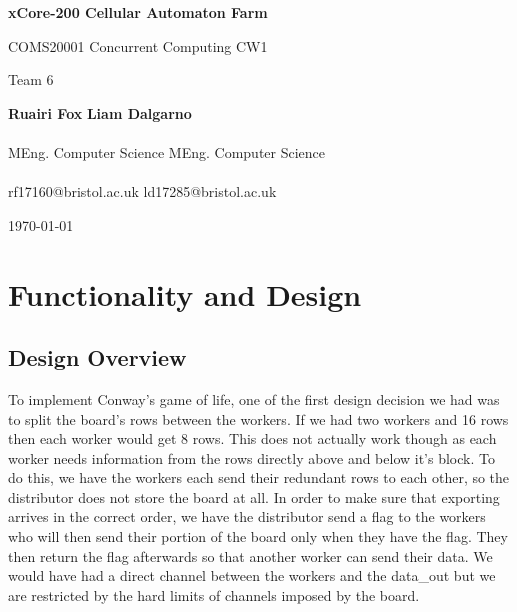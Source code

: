 \documentclass{article}
\begin{document}
    \begin{titlepage}
        \begin{center}
            \vspace*{2cm}
            
            {\huge \textbf{xCore-200 Cellular Automaton Farm}}
            
            \vspace{0.5cm}
            
            {\Large COMS20001 Concurrent Computing CW1}
            
            \vspace{0.5cm}
            
            {\large Team 6}
            
            \vspace{1cm}
            
            \hspace*{1cm} {\Large \textbf{Ruairi Fox}} \hfill {\Large \textbf{Liam Dalgarno}} \hspace*{1cm} \\~\\[-0.5em]
            \hspace*{1cm} MEng. Computer Science \hfill MEng. Computer Science  \hspace*{1cm} \\~\\[-1em]
            \hspace*{1cm} rf17160@bristol.ac.uk  \hfill ld17285@bristol.ac.uk  \hspace*{1cm} 
            
            \vspace{1cm}
            
            {\large \today}
        \end{center}
    \end{titlepage}

    \section{Functionality and Design}
    \subsection{Design Overview}
    To implement Conway's game of life, one of the first design decision we had was to split the board's rows between the workers. If we had two workers and 16 rows then each worker would get 8 rows. This does not actually work though as each worker needs information from the rows directly above and below it's block. To do this, we have the workers each send their redundant rows to each other, so the distributor does not store the board at all. In order to make sure that exporting arrives in the correct order, we have the distributor send a flag to the workers who will then send their portion of the board only when they have the flag. They then return the flag afterwards so that another worker can send their data. We would have had a direct channel between the workers and the data\_out but we are restricted by the hard limits of channels imposed by the board. 
\end{document}
